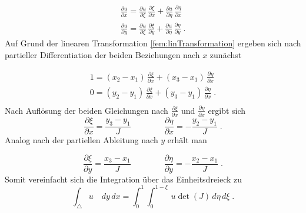 \begin{equation}
\begin{split}
	\frac{\partial u}{\partial x} = \frac{\partial u}{\partial \xi} \, \frac{\partial \xi}{\partial x} + \frac{\partial u}{\partial \eta} \, \frac{\partial \eta}{\partial x} \\
	\frac{\partial u}{\partial y} = \frac{\partial u}{\partial \xi} \, \frac{\partial \xi}{\partial y} + \frac{\partial u}{\partial \eta} \, \frac{\partial \eta}{\partial y} \; .
	\end{split}
\end{equation}
Auf Grund der linearen Transformation \eqref{fem:linTransformation} ergeben sich nach partieller Differentiation der beiden Beziehungen nach $x$ zunächst

\begin{equation}
			\begin{aligned}
			1  = (x_2 -x_1) \, \frac{\partial \xi}{\partial x} + (x_3 -x_1) \, \frac{\partial \eta}{\partial x} \\
			0 = (y_2 -y_1) \, \frac{\partial \xi}{\partial x} + (y_3 -y_1) \, \frac{\partial \eta}{\partial x} \; . \\
			 \end{aligned}
\end{equation}
Nach Auflösung  der beiden Gleichungen nach $\frac{\partial \xi}{\partial x}$ und $\frac{\partial \eta}{\partial x}$ ergibt sich
\begin{equation}
			\frac{\partial \xi}{\partial x} = \frac{y_3 - y_1}{J} \qquad \qquad \frac{\partial \eta}{\partial x} = -\frac{y_2 - y_1}{J} \; .
\end{equation}
Analog nach der partiellen Ableitung nach $y$ erhält man

\begin{equation}
			\frac{\partial \xi}{\partial y} = \frac{x_3 - x_1}{J} \qquad \qquad \frac{\partial \eta}{\partial y} = -\frac{x_2 - x_1}{J} \; .
\end{equation}
Somit vereinfacht sich die Integration über das Einheitsdreieck zu
\begin{equation}
			\int_{\triangle} u \quad dy \, dx = \int_0^1 \int_0^{1 - \xi} \, u \det (J) \, d \eta \, d \xi \; .
\end{equation}

